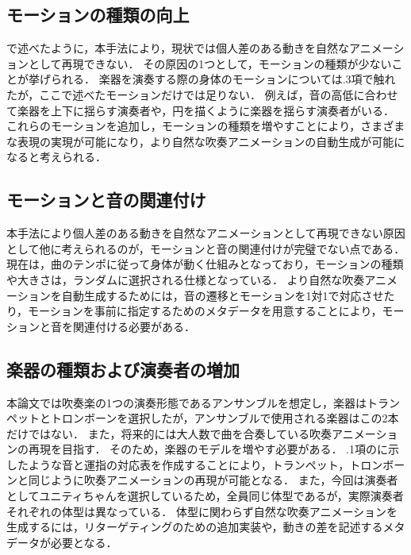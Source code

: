 \newpage
\subsection{モーションの種類の向上}
で述べたように，本手法により，現状では個人差のある動きを自然なアニメーションとして再現できない．
その原因の1つとして，モーションの種類が少ないことが挙げられる．
楽器を演奏する際の身体のモーションについては{.3項}で触れたが，ここで述べたモーションだけでは足りない．
例えば，音の高低に合わせて楽器を上下に揺らす演奏者や，円を描くように楽器を揺らす演奏者がいる．
これらのモーションを追加し，モーションの種類を増やすことにより，さまざまな表現の実現が可能になり，より自然な吹奏アニメーションの自動生成が可能になると考えられる．

\subsection{モーションと音の関連付け}
本手法により個人差のある動きを自然なアニメーションとして再現できない原因として他に考えられるのが，モーションと音の関連付けが完璧でない点である．
現在は，曲のテンポに従って身体が動く仕組みとなっており，モーションの種類や大きさは，ランダムに選択される仕様となっている．
より自然な吹奏アニメーションを自動生成するためには，音の遷移とモーションを1対1で対応させたり，モーションを事前に指定するためのメタデータを用意することにより，モーションと音を関連付ける必要がある．

\subsection{楽器の種類および演奏者の増加}
本論文では吹奏楽の1つの演奏形態であるアンサンブルを想定し，楽器はトランペットとトロンボーンを選択したが，アンサンブルで使用される楽器はこの2本だけではない．
また，将来的には大人数で曲を合奏している吹奏アニメーションの再現を目指す．
そのため，楽器のモデルを増やす必要がある．
{.1項}のに示したような音と運指の対応表を作成することにより，トランペット，トロンボーンと同じように吹奏アニメーションの再現が可能となる．
また，今回は演奏者としてユニティちゃんを選択しているため，全員同じ体型であるが，実際演奏者それぞれの体型は異なっている．
体型に関わらず自然な吹奏アニメーションを生成するには，リターゲティングのための追加実装や，動きの差を記述するメタデータが必要となる．